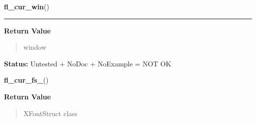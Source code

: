    \label{xformslib:library:fl_cur_win_}

    \vspace{0.5ex}

\hspace{.8\funcindent}\begin{boxedminipage}{\funcwidth}

    \raggedright \textbf{fl\_cur\_win}()

    \vspace{-1.5ex}

    \rule{\textwidth}{0.5\fboxrule}
\setlength{\parskip}{2ex}
\setlength{\parskip}{1ex}
      \textbf{Return Value}
    \vspace{-1ex}

      \begin{quote}
      window

      \end{quote}

\textbf{Status:} Untested + NoDoc + NoExample = NOT OK



    \end{boxedminipage}

    \label{xformslib:library:fl_cur_fs_}

    \vspace{0.5ex}

\hspace{.8\funcindent}\begin{boxedminipage}{\funcwidth}

    \raggedright \textbf{fl\_cur\_fs\_}()

\setlength{\parskip}{2ex}
\setlength{\parskip}{1ex}
      \textbf{Return Value}
    \vspace{-1ex}

      \begin{quote}
      XFontStruct class

      \end{quote}

    \end{boxedminipage}

    \label{xformslib:library:fl_cur_fs_}


